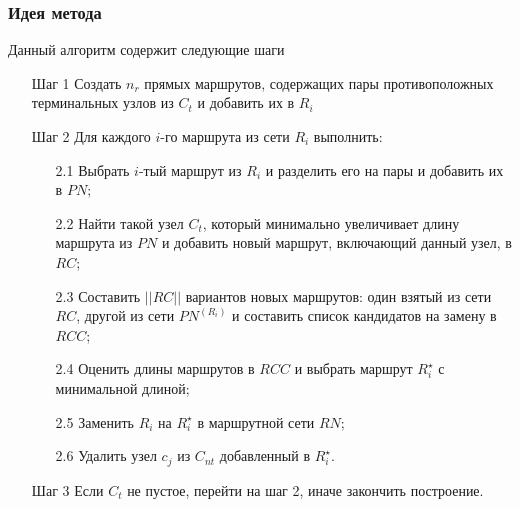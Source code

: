 \subsubsection{Идея метода}
Данный алгоритм содержит следующие шаги
\begin{enumerate}
    \item[Шаг 1] Создать \( n_r \) прямых маршрутов, содержащих пары противоположных терминальных 
        узлов из \( C_t \) и добавить их в \( R_i \)
    \item[Шаг 2] Для каждого \( i \)-го маршрута из сети \( R_i \) выполнить:
    \begin{enumerate}
        \item[2.1] Выбрать \( i \)-тый маршрут из \( R_i \) и разделить его на пары и добавить их в \( PN \);
        \item[2.2] Найти такой узел \( C_t \), который минимально увеличивает длину маршрута из \( PN \) и 
            добавить новый маршрут, включающий данный узел, в \( RC \);
        \item[2.3] Составить \( ||RC|| \) вариантов новых маршрутов: один взятый из сети \( RC \), другой 
            из сети \( PN^{(R_{i})} \) и составить список кандидатов на замену в \( RCC \);
        \item[2.4] Оценить длины маршрутов в \( RCC \) и выбрать маршрут \( R^{\star}_{i} \) 
            с минимальной длиной;
        \item[2.5] Заменить \( R_{i} \) на $R^{\star}_{i}$ в маршрутной сети \( RN \);
        \item[2.6] Удалить узел \( c_{j} \) из \( C_{nt} \) добавленный в \( R^{\star}_{i} \). 
    \end{enumerate}
    \item[Шаг 3] Если \( C_t \) не пустое, перейти на шаг 2, иначе закончить построение.
\end{enumerate}

